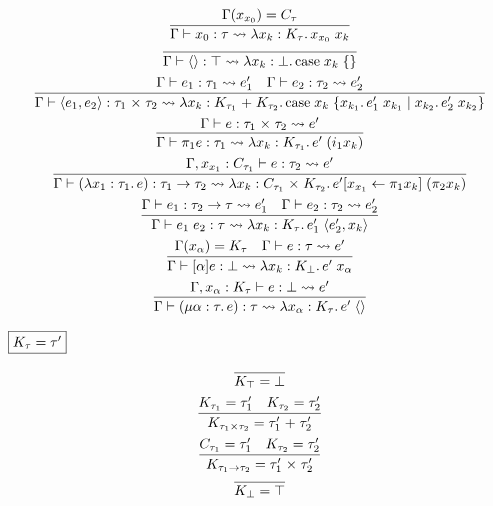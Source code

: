 \begin{gather*}
  \infer{\Gamma \vdash x_0: \tau \elaborate \lambda x_k: K_\tau\ldotp x_{x_0}\; x_k}{
    \Gamma(x_{x_0}) = C_\tau
  }
  \\
  \infer{\Gamma \vdash \langle\rangle: \top \elaborate \lambda x_k: \bot\ldotp \symcase x_k\; \{\}}{}
  \\
  \infer{\Gamma \vdash \langle e_1, e_2\rangle: \tau_1 \multi \tau_2 \elaborate \lambda x_k: K_{\tau_1} \plus K_{\tau_2}\ldotp \symcase x_k\; \{x_{k_1}\ldotp e_1'\; x_{k_1} \mid x_{k_2}\ldotp e_2'\; x_{k_2}\}}{
    \Gamma \vdash e_1: \tau_1 \elaborate e_1'
    &
    \Gamma \vdash e_2: \tau_2 \elaborate e_2'
  }
  \\
  \infer{\Gamma \vdash \pi_1 e: \tau_1 \elaborate \lambda x_k: K_{\tau_1}\ldotp e'\; (i_1 x_k)}{
    \Gamma \vdash e: \tau_1 \multi \tau_2 \elaborate e'
  }
  \\
  \infer{\Gamma \vdash (\lambda x_1: \tau_1\ldotp e): \tau_1 \to \tau_2 \elaborate \lambda x_k: C_{\tau_1} \multi K_{\tau_2}\ldotp e'[x_{x_1} \assign \pi_1 x_k]\; (\pi_2 x_k)}{
    \Gamma, x_{x_1}: C_{\tau_1} \vdash e: \tau_2 \elaborate e'
  }
  \\
  \infer{\Gamma \vdash e_1\; e_2: \tau \elaborate \lambda x_k: K_\tau\ldotp e_1'\; \langle e_2', x_k\rangle}{
    \Gamma \vdash e_1: \tau_2 \to \tau \elaborate e_1'
    &
    \Gamma \vdash e_2: \tau_2 \elaborate e_2'
  }
  \\
  \infer{\Gamma \vdash [\alpha] e: \bot \elaborate \lambda x_k: K_\bot\ldotp e'\; x_\alpha}{
    \Gamma(x_\alpha) = K_\tau
    &
    \Gamma \vdash e: \tau \elaborate e'
  }
  \\
  \infer{\Gamma \vdash (\mu \alpha: \tau\ldotp e): \tau \elaborate \lambda x_\alpha: K_\tau\ldotp e'\; \langle\rangle}{
    \Gamma, x_\alpha: K_\tau \vdash e: \bot \elaborate e'
  }
\end{gather*}

$\fbox{$K_\tau = \tau'$}$

\begin{gather*}
  \infer{K_\top = \bot}{}
  \\
  \infer{K_{\tau_1 \multi \tau_2} = \tau_1' \plus \tau_2'}{
    K_{\tau_1} = \tau_1'
    &
    K_{\tau_2} = \tau_2'
  }
  \\
  \infer{K_{\tau_1 \to \tau_2} = \tau_1' \multi \tau_2'}{
    C_{\tau_1} = \tau_1'
    &
    K_{\tau_2} = \tau_2'
  }
  \\
  \infer{K_\bot = \top}{}
\end{gather*}

